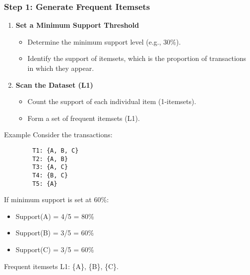 \documentclass[aspectratio=169]{beamer}
\begin{document}
\begin{frame}[fragile]
    \frametitle{Step 1: Generate Frequent Itemsets}
    \begin{enumerate}
        \item \textbf{Set a Minimum Support Threshold}
        \begin{itemize}
            \item Determine the minimum support level (e.g., 30\%).
            \item Identify the support of itemsets, which is the proportion of transactions in which they appear.
        \end{itemize}

        \item \textbf{Scan the Dataset (L1)}
        \begin{itemize}
            \item Count the support of each individual item (1-itemsets).
            \item Form a set of frequent itemsets (L1).
        \end{itemize}
    \end{enumerate}
    
    \begin{block}{Example}
        Consider the transactions:
        \begin{verbatim}
        T1: {A, B, C}
        T2: {A, B}
        T3: {A, C}
        T4: {B, C}
        T5: {A}
        \end{verbatim}
        If minimum support is set at 60\%:
        \begin{itemize}
            \item Support(A) = 4/5 = 80\%
            \item Support(B) = 3/5 = 60\%
            \item Support(C) = 3/5 = 60\%
        \end{itemize}
        Frequent itemsets L1: \{A\}, \{B\}, \{C\}.
    \end{block}
\end{frame}
\end{document}
